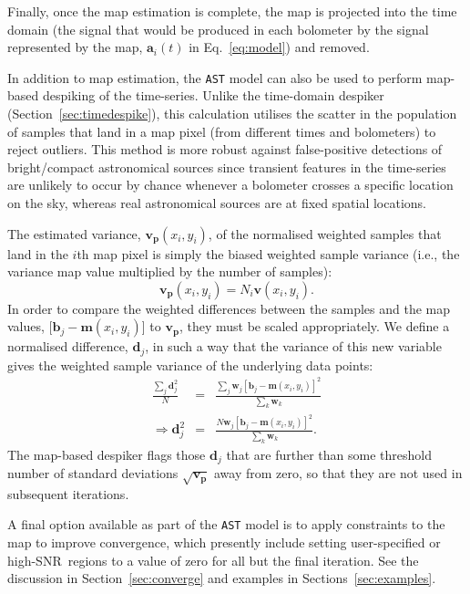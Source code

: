 \documentclass[useAMS,usenatbib,nofootinbib]{mn2e}
\newcommand{\snr}{SNR}
\newcommand{\model}[1]{\texttt{#1}}
\begin{document}
Finally, once the map estimation is complete, the map is projected
into the time domain (the signal that would be produced in each
bolometer by the signal represented by the map, $\mathbf{a}_i(t)$ in
Eq.~\ref{eq:model}) and removed.

In addition to map estimation, the \model{AST} model can also be used
to perform map-based despiking of the time-series. Unlike the
time-domain despiker (Section~\ref{sec:timedespike}), this calculation
utilises the scatter in the population of samples that land in a map
pixel (from different times and bolometers) to reject outliers. This
method is more robust against false-positive detections of
bright/compact astronomical sources since transient features in the
time-series are unlikely to occur by chance whenever a bolometer
crosses a specific location on the sky, whereas real astronomical
sources are at fixed spatial locations.

The estimated variance, $\mathbf{v_p}(x_i,y_i)$, of the normalised
weighted samples that land in the $i$th map pixel is simply the biased
weighted sample variance (i.e., the variance map value multiplied by
the number of samples):
%
\begin{equation}
  \mathbf{v_p}(x_i,y_i) = N_i \mathbf{v}(x_i,y_i).
\end{equation}
%
In order to compare the weighted differences between the samples and
the map values, [$\mathbf{b}_j - \mathbf{m}(x_i,y_i)$] to
$\mathbf{v_p}$, they must be scaled appropriately. We define a
normalised difference, $\mathbf{d}_j$, in such a way that the variance
of this new variable gives the weighted sample variance of the
underlying data points:
%
\begin{eqnarray}
  \frac{\sum_j \mathbf{d}_j^2}{N} &=&
  \frac{\sum_j \mathbf{w}_j [\mathbf{b}_j - \mathbf{m}(x_i,y_i)]^2}
       {\sum_k \mathbf{w}_k} \\
   \Rightarrow \mathbf{d}_j^2 &=& \frac{N \mathbf{w}_j [\mathbf{b}_j -
       \mathbf{m}(x_i,y_i)]^2}{ \sum_k \mathbf{w}_k} .
\end{eqnarray}
%
The map-based despiker flags those $\mathbf{d}_j$ that are further
than some threshold number of standard deviations
$\sqrt{\mathbf{v_p}}$ away from zero, so that they are not used in
subsequent iterations.

A final option available as part of the \model{AST} model is to apply
constraints to the map to improve convergence, which presently include
setting user-specified or high-\snr\ regions to a value of zero for
all but the final iteration. See the discussion in
Section~\ref{sec:converge} and examples in
Sections~\ref{sec:examples}.
\end{document}
